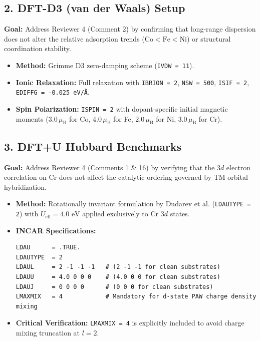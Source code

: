 \documentclass[11pt]{article}
\begin{document}
\subsection{2. DFT-D3 (van der Waals) Setup}
\textbf{Goal:} Address Reviewer 4 (Comment 2) by confirming that long-range dispersion does not alter the relative adsorption trends ($\text{Co} < \text{Fe} < \text{Ni}$) or structural coordination stability.
\begin{itemize}
    \item \textbf{Method:} Grimme D3 zero-damping scheme (\texttt{IVDW = 11}).
    \item \textbf{Ionic Relaxation:} Full relaxation with \texttt{IBRION = 2}, \texttt{NSW = 500}, \texttt{ISIF = 2}, \texttt{EDIFFG = -0.025~eV/\AA}.
    \item \textbf{Spin Polarization:} \texttt{ISPIN = 2} with dopant-specific initial magnetic moments ($3.0\,\mu_{\mathrm{B}}$ for Co, $4.0\,\mu_{\mathrm{B}}$ for Fe, $2.0\,\mu_{\mathrm{B}}$ for Ni, $3.0\,\mu_{\mathrm{B}}$ for Cr).
\end{itemize}

\subsection{3. DFT+U Hubbard Benchmarks}
\textbf{Goal:} Address Reviewer 4 (Comments 1 \& 16) by verifying that the $3d$ electron correlation on Cr does not affect the catalytic ordering governed by TM orbital hybridization.
\begin{itemize}
    \item \textbf{Method:} Rotationally invariant formulation by Dudarev et al. (\texttt{LDAUTYPE = 2}) with $U_{\mathrm{eff}} = 4.0\text{ eV}$ applied exclusively to Cr $3d$ states.
    \item \textbf{INCAR Specifications:}
    \begin{verbatim}
LDAU      = .TRUE.
LDAUTYPE  = 2
LDAUL     = 2 -1 -1 -1   # (2 -1 -1 for clean substrates)
LDAUU     = 4.0 0 0 0    # (4.0 0 0 for clean substrates)
LDAUJ     = 0 0 0 0      # (0 0 0 for clean substrates)
LMAXMIX   = 4            # Mandatory for d-state PAW charge density mixing
    \end{verbatim}
    \item \textbf{Critical Verification:} \texttt{LMAXMIX = 4} is explicitly included to avoid charge mixing truncation at $l=2$.
\end{itemize}
\end{document}
